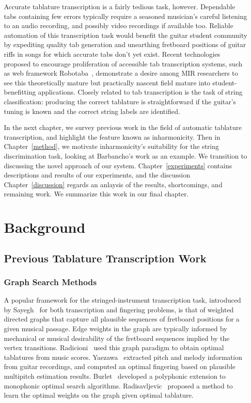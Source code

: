 \documentclass[12pt]{cmuthesis}
\begin{document}
Accurate tablature transcription is a fairly tedious task, however. Dependable tabs containing few errors typically require a seasoned musician's careful listening to an audio recording, and possibly video recordings if available too. Reliable automation of this transcription task would benefit the guitar student community by expediting quality tab generation and unearthing fretboard positions of guitar riffs in songs for which accurate tabs don't yet exist. Recent technologies proposed to encourage proliferation of accessible tab transcription systems, such as web framework Robotaba~\cite{burlet2013}, demonstrate a desire among MIR researchers to see this theoretically mature but practically nascent field mature into student-benefitting applications. Closely related to tab transcription is the task of string classification: producing the correct tablature is straightforward if the guitar's tuning is known and the correct string labels are identified. 

In the next chapter, we survey previous work in the field of automatic tablature transcription, and highlight the feature known as inharmonicity. Then in Chapter~\ref{method}, we motivate inharmonicity's suitability for the string discrimination task, looking at Barbancho's work as an example. We transition to discussing the novel approach of our system. Chapter~\ref{experiments} contains descriptions and results of our experiments, and the discussion Chapter~\ref{discussion} regards an anlaysis of the results, shortcomings, and remaining work. We summarize this work in our final chapter.

\noindent
\chapter{Background}
\section{Previous Tablature Transcription Work}
\subsection{Graph Search Methods}
A popular framework for the stringed-instrument transcription task, introduced by Sayegh~\cite{sayegh} for both transcription and fingering problems, is that of weighted directed graphs that capture all plausible sequences of fretboard positions for a given musical passage. Edge weights in the graph are typically informed by mechanical or musical desirability of the fretboard sequences implied by the vertex transitions. Radicioni~\cite{radicioni} used this graph paradigm to obtain optimal tablatures from music scores. Yaezawa~\cite{yaezawa} extracted pitch and melody information from guitar recordings, and computed an optimal fingering based on plausible multipitch estimation results. Burlet~\cite{burlet} developed a polyphonic extension to monophonic optimal search algorithms. Radisavljevic~\cite{radisav2004} proposed a method to learn the optimal weights on the graph given optimal tablature.
\end{document}
